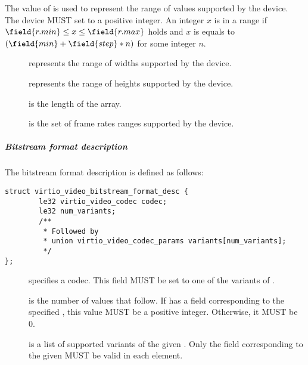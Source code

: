 \begin{description}
The value of  is used to represent
the range of values supported by the device. The device MUST set  to
a positive integer. An integer \(x\) is in a range  if \(\field{r.min} \le x \le
\field{r.max}\) holds and \(x\) is equals to \((\field{min} + \field{step} *
n)\) for some integer \(n\).

\begin{description}
\item[] represents the range of widths supported by the device.
\item[] represents the range of heights supported by the device.
\item[] is the length of the  array.
\item[] is the set of frame rates ranges supported
  by the device.
\end{description}

\subparagraph{Bitstream format description}

The bitstream format description  is
defined as follows:
\begin{lstlisting}
struct virtio_video_bitstream_format_desc {
        le32 virtio_video_codec codec;
        le32 num_variants;
        /**
         * Followed by
         * union virtio_video_codec_params variants[num_variants];
         */
};
\end{lstlisting}
\begin{description}
\item[] specifies a codec. This field MUST be set to one of the
  variants of .
\item[] is the number of 
  values that follow. If  has a field
  corresponding to the specified , this value MUST be a positive
  integer. Otherwise, it MUST be 0.
\item[] is a list of supported variants of the given
  . Only the field corresponding to the given  MUST be
  valid in each element.
\end{description}
\end{description}


